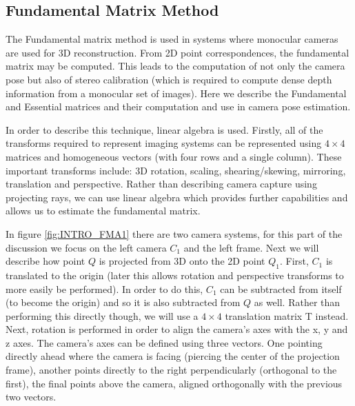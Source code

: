 
\subsection{Fundamental Matrix Method}

\label{FundamentalMatrixSection}

The Fundamental matrix method is used in systems where monocular cameras are used for 3D reconstruction. From 2D point correspondences, the fundamental matrix may be computed. This leads to the computation of not only the camera pose but also of stereo calibration (which is required to compute dense depth information from a monocular set of images). Here we describe the Fundamental and Essential matrices and their computation and use in camera pose estimation.

In order to describe this technique, linear algebra is used. Firstly, all of the transforms required to represent imaging systems can be represented using $4 \times 4$ matrices and homogeneous vectors (with four rows and a single column). These important transforms include: 3D rotation, scaling, shearing/skewing, mirroring, translation and perspective. Rather than describing camera capture using projecting rays, we can use linear algebra which provides further capabilities and allows us to estimate the fundamental matrix. 

In figure \ref{fig:INTRO_FMA1} there are two camera systems, for this part of the discussion we focus on the left camera $C_{1}$ and the left frame. Next we will describe how point $Q$ is projected from 3D onto the 2D point $Q_{1}$. First, $C_{1}$ is translated to the origin (later this allows rotation and perspective transforms to more easily be performed). In order to do this, $C_{1}$ can be subtracted from itself (to become the origin) and so it is also subtracted from $Q$ as well. Rather than performing this directly though, we will use a $4 \times 4$ translation matrix T instead. Next, rotation is performed in order to align the camera's axes with the x, y and z axes. The camera's axes can be defined using three vectors. One pointing directly ahead where the camera is facing (piercing the center of the projection frame), another points directly to the right perpendicularly (orthogonal to the first), the final points above the camera, aligned orthogonally with the previous two vectors. \\

